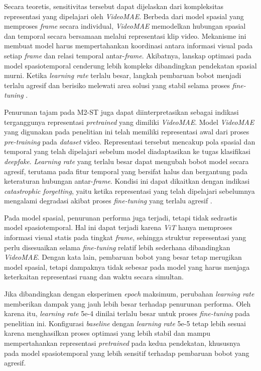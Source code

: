 Secara teoretis, sensitivitas tersebut dapat dijelaskan dari kompleksitas representasi yang dipelajari oleh \textit{VideoMAE}. Berbeda dari model spasial yang memproses \textit{frame} secara individual, \textit{VideoMAE} memodelkan hubungan spasial dan temporal secara bersamaan melalui representasi klip video. Mekanisme ini membuat model harus mempertahankan koordinasi antara informasi visual pada setiap \textit{frame} dan relasi temporal antar-\textit{frame}. Akibatnya, lanskap optimasi pada model spasiotemporal cenderung lebih kompleks dibandingkan pendekatan spasial murni. Ketika \textit{learning rate} terlalu besar, langkah pembaruan bobot menjadi terlalu agresif dan berisiko melewati area solusi yang stabil selama proses \textit{fine-tuning} \cite{tong2022videomaemaskedautoencodersdataefficient}\cite{Gu2021}.

Penurunan tajam pada M2-ST juga dapat diinterpretasikan sebagai indikasi terganggunya representasi \textit{pretrained} yang dimiliki \textit{VideoMAE}. Model \textit{VideoMAE} yang digunakan pada penelitian ini telah memiliki representasi awal dari proses \textit{pre-training} pada \textit{dataset} video. Representasi tersebut mencakup pola spasial dan temporal yang telah dipelajari sebelum model diadaptasikan ke tugas klasifikasi \textit{deepfake}. \textit{Learning rate} yang terlalu besar dapat mengubah bobot model secara agresif, terutama pada fitur temporal yang bersifat halus dan bergantung pada keteraturan hubungan antar-\textit{frame}. Kondisi ini dapat dikaitkan dengan indikasi \textit{catastrophic forgetting}, yaitu ketika representasi yang telah dipelajari sebelumnya mengalami degradasi akibat proses \textit{fine-tuning} yang terlalu agresif \cite{tong2022videomaemaskedautoencodersdataefficient}\cite{kirkpatrick2017overcomingcatastrophicforgetting}.

Pada model spasial, penurunan performa juga terjadi, tetapi tidak sedrastis model spasiotemporal. Hal ini dapat terjadi karena \textit{ViT} hanya memproses informasi visual statis pada tingkat \textit{frame}, sehingga struktur representasi yang perlu disesuaikan selama \textit{fine-tuning} relatif lebih sederhana dibandingkan \textit{VideoMAE}. Dengan kata lain, pembaruan bobot yang besar tetap merugikan model spasial, tetapi dampaknya tidak sebesar pada model yang harus menjaga keterkaitan representasi ruang dan waktu secara simultan.

Jika dibandingkan dengan eksperimen \textit{epoch} maksimum, perubahan \textit{learning rate} memberikan dampak yang jauh lebih besar terhadap penurunan performa. Oleh karena itu, \textit{learning rate} 5e-4 dinilai terlalu besar untuk proses \textit{fine-tuning} pada penelitian ini. Konfigurasi \textit{baseline} dengan \textit{learning rate} 5e-5 tetap lebih sesuai karena menghasilkan proses optimasi yang lebih stabil dan mampu mempertahankan representasi \textit{pretrained} pada kedua pendekatan, khususnya pada model spasiotemporal yang lebih sensitif terhadap pembaruan bobot yang agresif.

